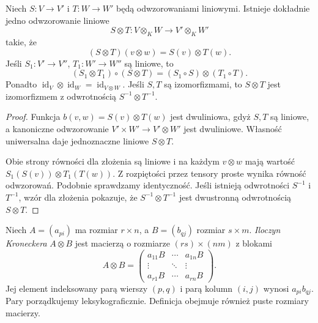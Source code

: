 \begin{twierdzenie}
\label{thm:lin10-odwzorowania}
Niech \(S\colon V\to V'\)
i \(T\colon W\to W'\)
będą odwzorowaniami liniowymi.
Istnieje dokładnie jedno
odwzorowanie liniowe
\[
 S\otimes T\colon V\otimes_KW
       \longrightarrow V'\otimes_KW'
\]
takie, że
\[
 (S\otimes T)(v\otimes w)
 =S(v)\otimes T(w).
\]
Jeśli \(S_1\colon V'\to V''\),
\(T_1\colon W'\to W''\)
są liniowe, to
\[
 (S_1\otimes T_1)\circ(S\otimes T)
 =(S_1\circ S)\otimes(T_1\circ T).
\]
Ponadto
\(\operatorname{id}_V\otimes
 \operatorname{id}_W
 =\operatorname{id}_{V\otimes W}\).
Jeśli \(S,T\) są izomorfizmami,
to \(S\otimes T\) jest
izomorfizmem z odwrotnością
\(S^{-1}\otimes T^{-1}\).
\end{twierdzenie}
\begin{proof}
Funkcja
\(b(v,w)=S(v)\otimes T(w)\)
jest dwuliniowa, gdyż
\(S,T\) są liniowe,
a kanoniczne odwzorowanie
\(V'\times W'\to V'\otimes W'\)
jest dwuliniowe.
Własność uniwersalna
daje jednoznaczne liniowe
\(S\otimes T\).

Obie strony równości dla złożenia
są liniowe i na każdym
\(v\otimes w\) mają wartość
\(S_1(S(v))\otimes T_1(T(w))\).
Z rozpiętości przez tensory proste
wynika równość odwzorowań.
Podobnie sprawdzamy identyczność.
Jeśli istnieją odwrotności \(S^{-1}\)
i \(T^{-1}\), wzór dla złożenia
pokazuje, że
\(S^{-1}\otimes T^{-1}\)
jest dwustronną odwrotnością
\(S\otimes T\).
\end{proof}

\begin{definicja}
\label{def:lin10-kronecker}
Niech \(A=(a_{pi})\)
ma rozmiar \(r\times n\),
a \(B=(b_{qj})\) rozmiar
\(s\times m\).
\emph{Iloczyn Kroneckera}
\(A\otimes B\) jest macierzą
o rozmiarze \((rs)\times(nm)\)
z blokami
\[
 A\otimes B=
 \begin{pmatrix}
 a_{11}B&\cdots&a_{1n}B\\
 \vdots&\ddots&\vdots\\
 a_{r1}B&\cdots&a_{rn}B
 \end{pmatrix}.
\]
Jej element indeksowany
parą wierszy \((p,q)\)
i parą kolumn \((i,j)\)
wynosi \(a_{pi}b_{qj}\).
Pary porządkujemy leksykograficznie.
Definicja obejmuje również
puste rozmiary macierzy.
\end{definicja}


